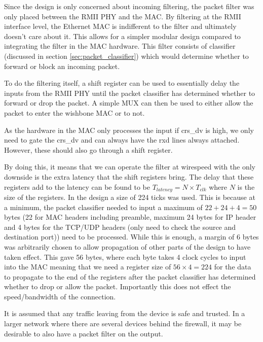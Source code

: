 Since the design is only concerned about incoming filtering, the packet filter was only placed between the RMII PHY and the MAC. By filtering at the RMII interface level, the Ethernet MAC is indifferent to the filter and ultimately doesn't care about it. This allows for a simpler modular design compared to integrating the filter in the MAC hardware. This filter consists of classifier (discussed in section \ref{sec:packet_classifier}) which would determine whether to forward or block an incoming packet.

To do the filtering itself, a shift register can be used to essentially delay the inputs from the RMII PHY until the packet classifier has determined whether to forward or drop the packet. A simple MUX can then be used to either allow the packet to enter the wishbone MAC or to not. 

As the hardware in the MAC only processes the input if crs\_dv is high, we only need to gate the crs\_dv and can always have the rxd lines always attached. However, these should also go through a shift register.

By doing this, it means that we can operate the filter at wirespeed with the only downside is the extra latency that the shift registers bring. The delay that these registers add to the latency can be found to be $T_{latency} = N\times T_{clk}$ where $N$ is the size of the registers. In the design a size of 224 ticks was used. This is because at a minimum, the packet classifier needed to input a maximum of $22 + 24 + 4 = 50$ bytes (22 for MAC headers including preamble, maximum 24 bytes for IP header and 4 bytes for the TCP/UDP headers (only need to check the source and destination port)) need to be processed. While this is enough, a margin of 6 bytes was arbitrarily chosen to allow propagation of other parts of the design to have taken effect. This gave 56 bytes, where each byte takes 4 clock cycles to input into the MAC meaning that we need a register size of $56 \times 4=224$ for the data to propagate to the end of the registers after the packet classifier has determined whether to drop or allow the packet. Importantly this does not effect the speed/bandwidth of the connection. 


It is assumed that any traffic leaving from the device is safe and trusted. In a larger network where there are several devices behind the firewall, it may be desirable to also have a packet filter on the output. 










